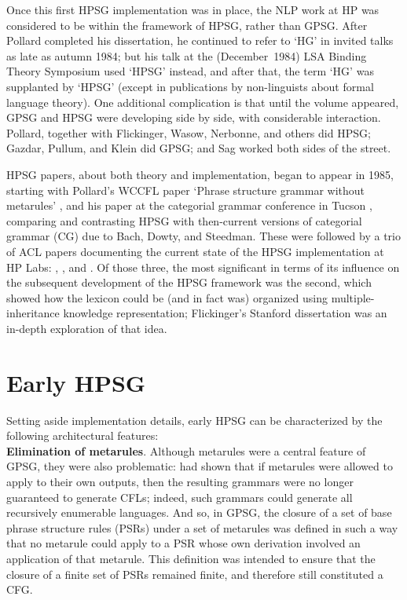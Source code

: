 \documentclass[output=paper]{langsci/langscibook}
\begin{document}
Once this first HPSG implementation was in place, the NLP work at HP was considered to be within the framework of HPSG, rather than GPSG. After Pollard completed his dissertation, he continued to refer to `HG' in invited talks as late as autumn 1984; but his talk at the (December~1984) LSA Binding Theory Symposium used `HPSG' instead, and after that, the term `HG' was supplanted by `HPSG' (except in publications by non-linguists about formal language theory). One additional complication is that until the \citet{GKPS85a} volume appeared, GPSG and HPSG were developing side by side, with  considerable interaction.  Pollard, together with Flickinger, Wasow, Nerbonne, and others did HPSG; Gazdar, Pullum, and Klein did GPSG; and Sag worked both sides of the street.

HPSG papers, about both theory and implementation, began to appear in 1985, starting with Pollard's WCCFL paper `Phrase structure grammar without metarules' \citep{Pollard85a-u}, and his paper at the categorial grammar conference in Tucson \citep{Pollard88a}, comparing and contrasting HPSG with then-current versions of categorial grammar (CG) due to Bach, Dowty, and Steedman. These were followed by a trio of ACL papers documenting the current state of the HPSG implementation at HP Labs: \citet{creary-pollard:1985:ACL}, \citet{FPW85a}, and \citet{PP85}. Of those three, the most significant in terms of its influence on the subsequent development of the HPSG framework was the second, which showed how the lexicon could be (and in fact was) organized using multiple- inheritance knowledge representation; Flickinger's Stanford dissertation \citep{Flickinger87} was an in-depth exploration of that idea.

\section{Early HPSG}

Setting aside implementation details, early HPSG can be characterized by the following architectural features:\\

\noindent
{\bf Elimination of metarules}. Although metarules were a central feature of GPSG, they were also problematic: \citet{UszPet1982} had shown  that if metarules were allowed to apply to their own outputs, then the resulting grammars were no longer guaranteed to generate CFLs; indeed, such grammars could generate all recursively enumerable languages. And so, in GPSG, the closure of a set of base phrase structure rules (PSRs) under a set of metarules was defined in such a way that no metarule could apply to a PSR whose own derivation involved an application of that metarule. This definition was intended to ensure that the closure of a finite set of PSRs remained finite, and therefore still constituted a CFG.
\end{document}
